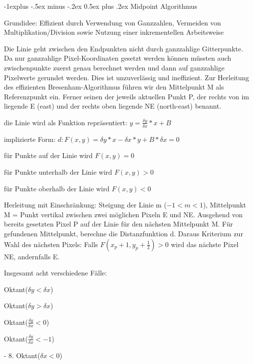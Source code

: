 \documentclass[landscape]{article}
\makeatletter
\renewcommand{\subsection}{\@startsection{subsection}{2}{0mm}%
                                {-1explus -.5ex minus -.2ex}%
                                {0.5ex plus .2ex}%
                                {\normalfont\normalsize\bfseries}}
\makeatother
\begin{document}
\begin{multicols}{3}
  \subsection{ Midpoint Algorithmus}
  \begin{itemize*}
    \item Grundidee: Effizient durch Verwendung von Ganzzahlen, Vermeiden von Multiplikation/Division sowie Nutzung einer inkrementellen Arbeitsweise
    \item Die Linie geht zwischen den Endpunkten nicht durch ganzzahlige Gitterpunkte. Da nur ganzzahlige Pixel-Koordinaten gesetzt werden können müssten auch zwischenpunkte zuerst genau berechnet werden und dann auf ganzzahlige Pixelwerte gerundet werden. Dies ist unzuverlässig und ineffizient. Zur Herleitung des effizienten Bresenham-Algorithmus führen wir den Mittelpunkt M als Referenzpunkt ein. Ferner seinen der jeweils aktuellen Punkt P, der rechts von im liegende E (east) und der rechts oben liegende NE (north-east) benannt.
    \item die Linie wird als Funktion repräsentiert: $y=\frac{\delta y}{\delta x}*x+B$
    \item implizierte Form: $d: F(x,y)=\delta y*x-\delta x*y+B*\delta x = 0$
    \item für Punkte auf der Linie wird $F(x,y)=0$
    \item für Punkte unterhalb der Linie wird $F(x,y)>0$
    \item für Punkte oberhalb der Linie wird $F(x,y)<0$
    \item Herleitung mit Einschränkung: Steigung der Linie m ($-1<m<1$), Mittelpunkt M = Punkt vertikal zwischen zwei möglichen Pixeln E und NE. Ausgehend von bereits gesetzten Pixel P auf der Linie für den nächsten Mittelpunkt M. Für gefundenen Mittelpunkt, berechne die Distanzfunktion d. Daraus Kriterium zur Wahl des nächsten Pixels: Falls $F(x_p + 1, y_p+\frac{1}{2})>0$ wird das nächste Pixel NE, andernfalls E.
    \item Insgesamt acht verschiedene Fälle:
    \begin{enumerate*}
      \item Oktant($\delta y < \delta x$)
      \item Oktant($\delta y > \delta x$)
      \item Oktant($\frac{\delta y}{\delta x}<  0$)
      \item Oktant($\frac{\delta y}{\delta x}< -1$)
      \item - 8. Oktant($\delta x < 0$)
    \end{enumerate*}
  \end{itemize*}
  

\end{multicols}
\end{document}
